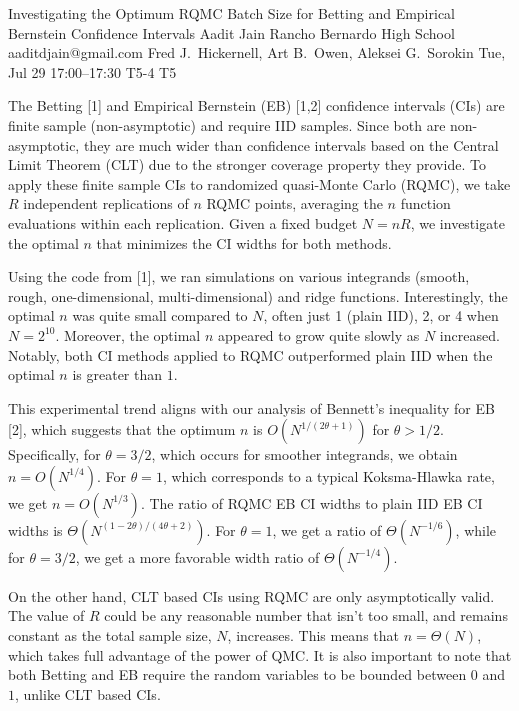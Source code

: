 \begin{talk}
  {Investigating the Optimum RQMC Batch Size for Betting and Empirical Bernstein Confidence Intervals}%
  {Aadit Jain}%
  {Rancho Bernardo High School}%
  {aaditdjain@gmail.com}%
  {Fred J.\ Hickernell, Art B.\ Owen, Aleksei G.\ Sorokin}%
  {}%
  {Tue, Jul 29 17:00–17:30}%
  {T5-4}%
  {T5}%
  
				
			

The Betting [1] and Empirical Bernstein (EB) [1,2] confidence intervals (CIs) are finite sample (non-asymptotic) and require IID samples. Since both are non-asymptotic, they are much wider than confidence intervals based on the Central Limit Theorem (CLT) due to the stronger coverage property they provide. To apply these finite sample CIs to randomized quasi-Monte Carlo (RQMC), we take $R$ independent replications of $n$ RQMC points, averaging the $n$ function evaluations within each replication. Given a fixed budget $N = nR$, we investigate the optimal $n$ that minimizes the CI widths for both methods.  

Using the code from [1], we ran simulations on various integrands (smooth, rough, one-dimensional, multi-dimensional) and ridge functions. Interestingly, the optimal $n$ was quite small compared to $N$, often just 1 (plain IID), 2, or 4 when $N = 2^{10}$. Moreover, the optimal $n$ appeared to grow quite slowly as $N$ increased. Notably, both CI methods applied to RQMC outperformed plain IID when the optimal $n$ is greater than $1$.  

This experimental trend aligns with our analysis of Bennett’s inequality for EB [2], which suggests that the optimum $n$ is $O(N^{1/(2\theta + 1)})$ for $\theta > 1/2$. 
Specifically, for $\theta = 3/2$, which occurs for smoother integrands, we obtain $n = O(N^{1/4})$. For $\theta = 1$, which corresponds to a typical Koksma-Hlawka rate, we get $n = O(N^{1/3})$. The ratio of RQMC EB CI widths to plain IID EB CI widths is $\Theta( N^{(1-2\theta)/(4\theta+2)})$. For $\theta=1$,
we get a ratio of $\Theta(N^{-1/6})$,
while for $\theta=3/2$,
we get a more favorable width ratio of $\Theta(N^{-1/4})$. 


On the other hand, CLT based CIs using RQMC  are only asymptotically valid. The value of $R$ could be any reasonable number that isn't too small, and remains constant as the total sample size, $N$, increases.  This means that $n = \Theta(N)$, which takes full advantage of the power of QMC.  It is also important to note that both Betting and EB require the random variables to be bounded between $0$ and $1$, unlike CLT based CIs. 



\end{talk}
